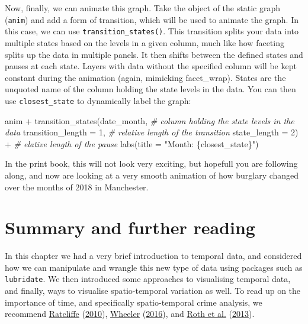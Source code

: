 \documentclass[
  krantz2]{krantz}
\makeatletter
\newenvironment{Shaded}{\begin{snugshade}}{\end{snugshade}}
\newcommand{\AttributeTok}[1]{\textcolor[rgb]{0.61,0.61,0.61}{#1}}
\newcommand{\CommentTok}[1]{\textcolor[rgb]{0.37,0.37,0.37}{\textit{#1}}}
\newcommand{\DecValTok}[1]{\textcolor[rgb]{0.06,0.06,0.06}{#1}}
\newcommand{\FunctionTok}[1]{\textcolor[rgb]{0,0,0}{#1}}
\newcommand{\NormalTok}[1]{#1}
\newcommand{\SpecialCharTok}[1]{\textcolor[rgb]{0,0,0}{#1}}
\newcommand{\StringTok}[1]{\textcolor[rgb]{0.5,0.5,0.5}{#1}}
\newenvironment{kframe}{%
\medskip{}
\setlength{\fboxsep}{.8em}
 \def\at@end@of@kframe{}%
 \ifinner\ifhmode%
  \def\at@end@of@kframe{\end{minipage}}%
  \begin{minipage}{\columnwidth}%
 \fi\fi%
 \def\FrameCommand##1{\hskip\@totalleftmargin \hskip-\fboxsep
 \colorbox{shadecolor}{##1}\hskip-\fboxsep
     \hskip-\linewidth \hskip-\@totalleftmargin \hskip\columnwidth}%
 \MakeFramed {\advance\hsize-\width
   \@totalleftmargin\z@ \linewidth\hsize
   \@setminipage}}%
 {\par\unskip\endMakeFramed%
 \at@end@of@kframe}
\renewenvironment{Shaded}{\begin{kframe}}{\end{kframe}}
\makeatother
\begin{document}
Now, finally, we can animate this graph. Take the object of the static graph (\texttt{anim}) and add a form of transition, which will be used to animate the graph. In this case, we can use \texttt{transition\_states()}. This transition splits your data into multiple states based on the levels in a given column, much like how faceting splits up the data in multiple panels. It then shifts between the defined states and pauses at each state. Layers with data without the specified column will be kept constant during the animation (again, mimicking facet\_wrap). States are the unquoted name of the column holding the state levels in the data. You can then use \texttt{closest\_state} to dynamically label the graph:

\begin{Shaded}
\begin{Highlighting}[]
\NormalTok{anim }\SpecialCharTok{+} 
  \FunctionTok{transition\_states}\NormalTok{(date\_month,  }\CommentTok{\# column holding the state levels in the data}
                    \AttributeTok{transition\_length =} \DecValTok{1}\NormalTok{, }\CommentTok{\# relative length of the transition}
                    \AttributeTok{state\_length =} \DecValTok{2}\NormalTok{) }\SpecialCharTok{+} \CommentTok{\# elative length of the pause }
  \FunctionTok{labs}\NormalTok{(}\AttributeTok{title =} \StringTok{"Month: \{closest\_state\}"}\NormalTok{)}
\end{Highlighting}
\end{Shaded}

In the print book, this will not look very exciting, but hopefull you are following along, and now are looking at a very smooth animation of how burglary changed over the months of 2018 in Manchester.

\hypertarget{summary-and-further-reading-5}{%
\section{Summary and further reading}\label{summary-and-further-reading-5}}

In this chapter we had a very brief introduction to temporal data, and considered how we can manipulate and wrangle this new type of data using packages such as \texttt{lubridate}. We then introduced some approaches to visualising temporal data, and finally, ways to visualise spatio-temporal variation as well. To read up on the importance of time, and specifically spatio-temporal crime analysis, we recommend \protect\hyperlink{ref-Ratcliffe_2010}{Ratcliffe} (\protect\hyperlink{ref-Ratcliffe_2010}{2010}), \protect\hyperlink{ref-Wheeler_2016}{Wheeler} (\protect\hyperlink{ref-Wheeler_2016}{2016}), and \protect\hyperlink{ref-Roth_2013}{Roth et al.} (\protect\hyperlink{ref-Roth_2013}{2013}).
\end{document}
